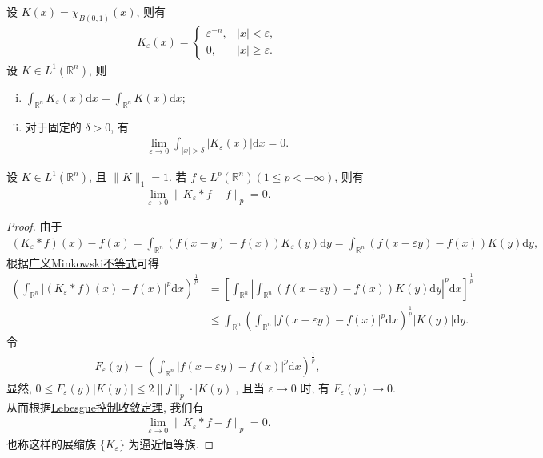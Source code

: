 \documentclass[../../main.tex]{subfiles}%
\begin{document}
\begin{proposition}
设 $K(x)=\chi_{B(0,1)}(x)$, 则有
\begin{align*}
K_\varepsilon(x) = 
\begin{cases}
\varepsilon^{-n}, & |x|<\varepsilon, \\
0, & |x| \geqslant \varepsilon.
\end{cases}
\end{align*}
设 $K\in L^1(\mathbb{R}^n)$, 则
\begin{enumerate}[(i)]
\item $\displaystyle \int_{\mathbb{R}^n} K_\varepsilon(x) \mathrm{d}x = \int_{\mathbb{R}^n} K(x) \mathrm{d}x$;
\item 对于固定的 $\delta>0$, 有
\begin{align*}
\lim\limits_{\varepsilon\to 0} \int_{|x|>\delta} |K_\varepsilon(x)| \mathrm{d}x = 0.
\end{align*}
\end{enumerate}
\end{proposition}

\begin{theorem}\label{theorem:实变函数--定理6.22}
设 $K\in L^1(\mathbb{R}^n)$, 且 $\|K\|_1=1$. 若 $f\in L^p(\mathbb{R}^n)(1\leqslant p<+\infty)$, 则有
\begin{align}
\lim\limits_{\varepsilon\to 0} \|K_\varepsilon * f - f\|_p = 0.
\label{eq:approx_id}
\end{align}
\end{theorem}
\begin{proof}
由于
\begin{align*}
(K_\varepsilon * f)(x) - f(x) = \int_{\mathbb{R}^n} (f(x-y)-f(x)) K_\varepsilon(y) \mathrm{d}y 
= \int_{\mathbb{R}^n} (f(x-\varepsilon y)-f(x)) K(y) \mathrm{d}y,
\end{align*}
根据\hyperref[theorem:广义Minkowski不等式]{广义Minkowski不等式}可得
\begin{align*}
\left( \int_{\mathbb{R}^n} |(K_\varepsilon * f)(x) - f(x)|^p \mathrm{d}x \right)^{\frac{1}{p}}
&= \left[ \int_{\mathbb{R}^n} \left| \int_{\mathbb{R}^n} (f(x-\varepsilon y)-f(x)) K(y) \mathrm{d}y \right|^p \mathrm{d}x \right]^{\frac{1}{p}} \\
&\leqslant \int_{\mathbb{R}^n} \left( \int_{\mathbb{R}^n} |f(x-\varepsilon y)-f(x)|^p \mathrm{d}x \right)^{\frac{1}{p}} |K(y)| \mathrm{d}y.
\end{align*}
令
\begin{align*}
F_\varepsilon(y) = \left( \int_{\mathbb{R}^n} |f(x-\varepsilon y)-f(x)|^p \mathrm{d}x \right)^{\frac{1}{p}},
\end{align*}
显然, $0\leqslant F_\varepsilon(y)|K(y)| \leqslant 2\|f\|_p \cdot |K(y)|$, 且当 $\varepsilon\to 0$ 时, 有 $F_\varepsilon(y)\to 0$. 从而根据\hyperref[theorem:控制收敛定理]{Lebesgue控制收敛定理}, 我们有
\begin{align*}
\lim\limits_{\varepsilon\to 0} \|K_\varepsilon * f - f\|_p = 0.
\end{align*}
也称这样的展缩族 $\{K_\varepsilon\}$ 为逼近恒等族.
\end{proof}
\end{document}
